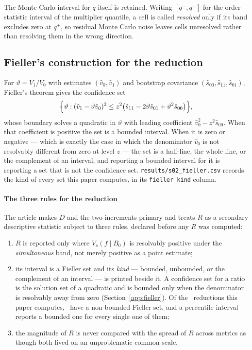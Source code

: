 The Monte Carlo interval for $q$ itself is retained. Writing
$[q^-, q^+]$ for the order-statistic interval of the multiplier quantile, a
cell is called \emph{resolved} only if its band excludes zero at $q^+$, so
residual Monte Carlo noise leaves cells unresolved rather than resolving them
in the wrong direction.

\subsection*{Fieller's construction for the reduction}
\label{app:fieller}

For $\vartheta = V_1 / V_0$ with estimates $(\hat v_0, \hat v_1)$ and
bootstrap covariance $(\hat s_{00}, \hat s_{11}, \hat s_{01})$, Fieller's
theorem gives the confidence set
\[
\Bigl\{\vartheta : (\hat v_1 - \vartheta \hat v_0)^2 \leq
z^2\bigl(\hat s_{11} - 2\vartheta \hat s_{01} +
\vartheta^2 \hat s_{00}\bigr)\Bigr\},
\]
whose boundary solves a quadratic in $\vartheta$ with leading coefficient
$\hat v_0^2 - z^2 \hat s_{00}$. When that coefficient is positive the set is a
bounded interval. When it is zero or negative --- which is exactly the case in
which the denominator $\hat v_0$ is not resolvably different from zero at
level $z$ --- the set is a half-line, the whole line, or the complement of an
interval, and reporting a bounded interval for it is reporting a set that is
not the confidence set. \texttt{results/s02\_fieller.csv} records the kind of
every set this paper computes, in its \texttt{fieller\_kind} column.

\paragraph{The three rules for the reduction} The article makes $D$ and the two increments primary and treats $R$ as a secondary descriptive statistic subject to three rules, declared before any $R$ was computed:
\begin{enumerate}
\item $R$ is reported only where $V_s(f \mid B_0)$ is resolvably positive
under the \emph{simultaneous} band, not merely positive as a point estimate;
\item its interval is a Fieller set and its \emph{kind} --- bounded,
unbounded, or the complement of an interval --- is printed beside it. A
confidence set for a ratio is the solution set of a quadratic
\citep{fieller1954} and is bounded only when the denominator is resolvably
away from zero (Section~\ref{app:fieller}). Of the \nFieller\ reductions this paper
computes, \nFiellerUnbounded\ have a non-bounded Fieller set, and a percentile
interval reports a bounded one for every single one of them;
\item the magnitude of $R$ is never compared with the spread of $R$ across
metrics as though both lived on an unproblematic common scale.
\end{enumerate}

